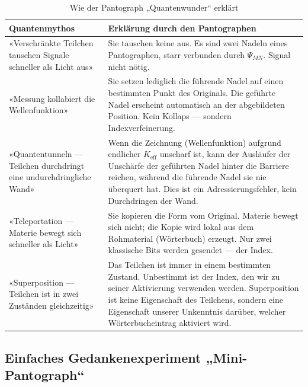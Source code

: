 \documentclass[12pt,a4paper]{article}
\begin{document}
	\begin{table}[htbp]
		\centering
		\caption{Wie der Pantograph „Quantenwunder“ erklärt}
		\label{tab:myths}
		\begin{tabular}{|p{4.5cm}|p{9cm}|}
			\hline
			\textbf{Quantenmythos} & \textbf{Erklärung durch den Pantographen} \\
			\hline
			«Verschränkte Teilchen tauschen Signale schneller als Licht aus» & Sie tauschen keine aus. Es sind zwei Nadeln eines Pantographen, starr verbunden durch \(\Psi_{MN}\). Signal nicht nötig. \\
			\hline
			«Messung kollabiert die Wellenfunktion» & Sie setzen lediglich die führende Nadel auf einen bestimmten Punkt des Originals. Die geführte Nadel erscheint automatisch an der abgebildeten Position. Kein Kollaps — sondern Indexverfeinerung. \\
			\hline
			«Quantentunneln — Teilchen durchdringt eine undurchdringliche Wand» & Wenn die Zeichnung (Wellenfunktion) aufgrund endlicher \(K_{\mathrm{eff}}\) unscharf ist, kann der Ausläufer der Unschärfe der geführten Nadel hinter die Barriere reichen, während die führende Nadel sie nie überquert hat. Dies ist ein Adressierungsfehler, kein Durchdringen der Wand. \\
			\hline
			«Teleportation — Materie bewegt sich schneller als Licht» & Sie kopieren die Form vom Original. Materie bewegt sich nicht; die Kopie wird lokal aus dem Rohmaterial (Wörterbuch) erzeugt. Nur zwei klassische Bits werden gesendet — der Index. \\
			\hline
			«Superposition — Teilchen ist in zwei Zuständen gleichzeitig» & Das Teilchen ist immer in einem bestimmten Zustand. Unbestimmt ist der Index, den wir zu seiner Aktivierung verwenden werden. Superposition ist keine Eigenschaft des Teilchens, sondern eine Eigenschaft unserer Unkenntnis darüber, welcher Wörterbucheintrag aktiviert wird. \\
			\hline
		\end{tabular}
	\end{table}
	
	\subsection{Einfaches Gedankenexperiment „Mini-Pantograph“}
	
\end{document}
